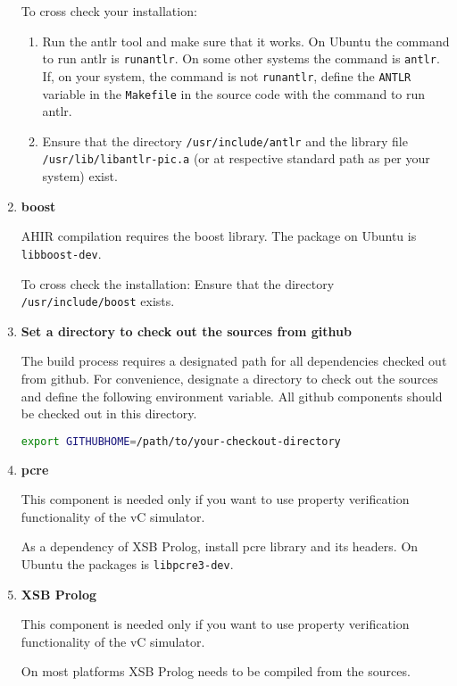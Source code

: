 \documentclass[12pt,a4paper]{article}
\begin{document}
\begin{enumerate}
To cross check your installation:

\begin{enumerate}
\item Run the antlr tool and make sure that it works. On Ubuntu the command to run antlr is \texttt{runantlr}. On some other systems the command is \texttt{antlr}. If, on your system, the command is not \texttt{runantlr}, define the \texttt{ANTLR} variable in the \texttt{Makefile} in the source code with the command to run antlr.

\item Ensure that the directory \texttt{/usr/include/antlr} and the library file \texttt{/usr/lib/libantlr-pic.a} (or at respective standard path as per your system) exist.
\end{enumerate}

\item \textbf{boost}

AHIR compilation requires the boost library. The package on Ubuntu is \texttt{libboost-dev}.

To cross check the installation: Ensure that the directory \texttt{/usr/include/boost} exists.

\item \textbf{Set a directory to check out the sources from github}

The build process requires a designated path for all dependencies checked out from github. For convenience, designate a directory to check out the sources and define the following environment variable. All github components should be checked out in this directory.

\begin{lstlisting}[language=bash,style=snippet]
export GITHUBHOME=/path/to/your-checkout-directory
\end{lstlisting}

\item \textbf{pcre}

This component is needed only if you want to use property verification functionality of the vC simulator.

As a dependency of XSB Prolog, install pcre library and its headers. On Ubuntu the packages is \texttt{libpcre3-dev}.

\item \textbf{XSB Prolog}

This component is needed only if you want to use property verification functionality of the vC simulator.

On most platforms XSB Prolog needs to be compiled from the sources.


\end{enumerate}
\end{document}
